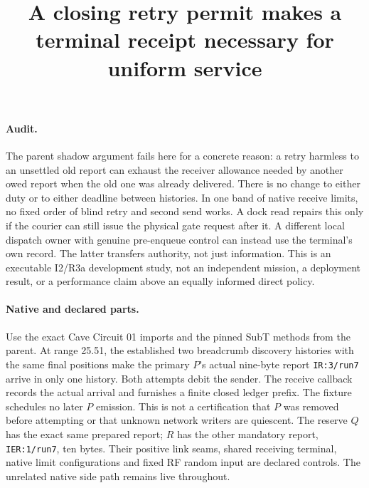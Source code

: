 \documentclass{article}
\title{A closing retry permit makes a terminal receipt necessary for uniform service}
\author{}
\date{}
\begin{document}
\maketitle

\paragraph{Audit.}
The parent shadow argument fails here for a concrete reason: a
retry harmless to an unsettled old report can exhaust the
receiver allowance needed by another owed report when the old
one was already delivered. There is no change to either duty or
to either deadline between histories. In one band of native receive
limits, no fixed order of blind retry and second send works.
A dock read repairs this only if the courier can still issue the
physical gate request after it. A different local dispatch owner
with genuine pre-enqueue control can instead use the terminal's
own record. The latter transfers authority, not just information.
This is an executable I2/R3a development study, not an independent
mission, a deployment result, or a performance claim above an
equally informed direct policy.

\paragraph{Native and declared parts.}
Use the exact Cave Circuit 01 imports and the pinned SubT methods
from the parent. At range 25.51, the established two breadcrumb
discovery histories with the same final positions make the primary
$P$'s actual nine-byte report \texttt{IR:3/run7} arrive in only one
history. Both attempts debit the sender. The receive callback
records the actual arrival and furnishes a finite closed ledger
prefix. The fixture schedules no later $P$ emission. This is not
a certification that $P$ was removed before attempting or that
unknown network writers are quiescent. The reserve $Q$ has the
exact same prepared report; $R$ has the other mandatory report,
\texttt{IER:1/run7}, ten bytes. Their positive link seams,
shared receiving terminal, native limit configurations and fixed
RF random input are declared controls. The unrelated native
side path remains live throughout.
\end{document}

